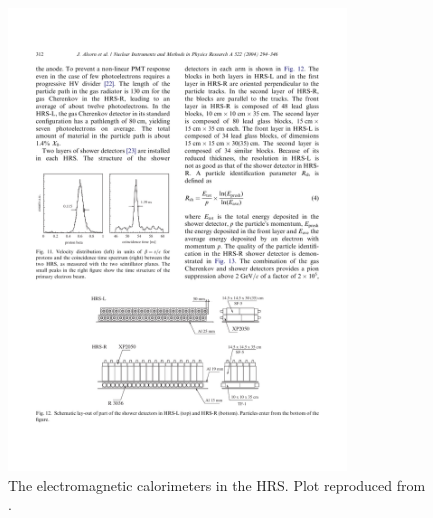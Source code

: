 \begin{figure}[tb!]
  \centering
  \includegraphics[width=0.8\textwidth]{figs/calorimeters.pdf}
  \caption[The electromagnetic calorimeters in the HRS.]{The electromagnetic calorimeters in the HRS. Plot reproduced from \cite{Alcorn2004}. \label{C5S4SS2F5}}
\end{figure}

